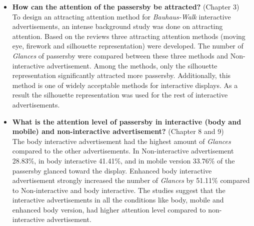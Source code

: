 


\begin{itemize}

\item \textbf{How can the attention of the passersby be attracted?} (Chapter 3) \\
To design an attracting attention method for \emph{Bauhaus-Walk} interactive advertisements, an intense background study was done on attracting attention. Based on the reviews three attracting attention methods (moving eye, firework and silhouette representation) were developed. The number of \emph{Glances} of passersby were compared between these three methods and Non-interactive advertisement. Among the methods, only the silhouette representation significantly attracted more passersby. Additionally, this method is one of widely acceptable methods for interactive displays. As a result the silhouette representation was used for the rest of interactive advertisements.

\item \textbf{What is the attention level of passersby in interactive (body and mobile) and non-interactive advertisement?} (Chapter 8 and 9)\\
The body interactive advertisement had the highest amount of \emph{Glances} compared to the other advertisements. In Non-interactive advertisement 28.83\%, in body interactive 41.41\%, and in mobile version 33.76\% of the passersby glanced toward the display. Enhanced body interactive advertisement strongly increased the number of \emph{Glances} by 51.11\% compared to Non-interactive and body interactive. The studies suggest that the interactive advertisements in all the conditions like body, mobile and enhanced body version, had higher attention level compared to non-interactive advertisement. 



\begin{table}[H]
\caption{Week sequence}
\label{tab:advertisementWeeks}
\centering
{}
\end{table}







\end{itemize}

